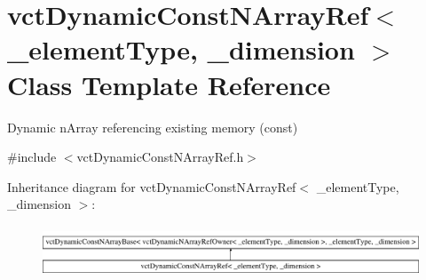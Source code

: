 \hypertarget{classvct_dynamic_const_n_array_ref}{}\section{vct\+Dynamic\+Const\+N\+Array\+Ref$<$ \+\_\+element\+Type, \+\_\+dimension $>$ Class Template Reference}
\label{classvct_dynamic_const_n_array_ref}


Dynamic n\+Array referencing existing memory (const)  




{\ttfamily \#include $<$vct\+Dynamic\+Const\+N\+Array\+Ref.\+h$>$}

Inheritance diagram for vct\+Dynamic\+Const\+N\+Array\+Ref$<$ \+\_\+element\+Type, \+\_\+dimension $>$\+:\begin{figure}[H]
\begin{center}
\leavevmode
\includegraphics[height=1.577465cm]{db/d5c/classvct_dynamic_const_n_array_ref}
\end{center}
\end{figure}

